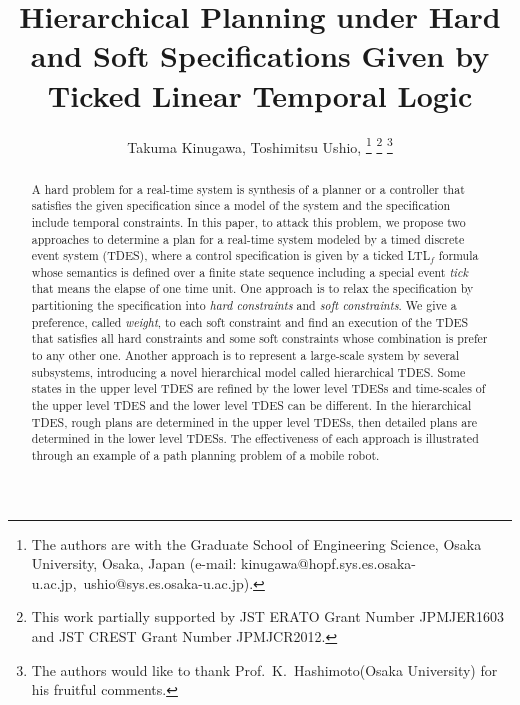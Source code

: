 \documentclass{article}
\begin{document}
%
\title{Hierarchical Planning under Hard and Soft  Specifications Given by Ticked Linear Temporal Logic}
%
\author{Takuma Kinugawa, Toshimitsu Ushio, 
\thanks{The authors are with the Graduate School of Engineering Science, Osaka
University, Osaka, Japan (e-mail: kinugawa@hopf.sys.es.osaka-u.ac.jp,\ ushio@sys.es.osaka-u.ac.jp). }
\thanks{This work partially supported by JST ERATO Grant Number JPMJER1603 and JST CREST Grant Number JPMJCR2012.}
\thanks{The authors would like to thank Prof.\ K.\ Hashimoto(Osaka University) for his fruitful comments.}
}
\maketitle

\begin{abstract}
A hard problem for a real-time system is synthesis of a  planner or a controller that satisfies the given specification since a model of the system and the specification include temporal constraints.
In this paper, to attack this problem, we propose two approaches to determine a plan for a real-time system modeled by a timed discrete event system (TDES), where a control specification is given by a ticked LTL$_f$ formula whose semantics is defined over a finite state sequence including a special event \textit{tick} that means the elapse of one time unit.
One approach is to relax the specification by partitioning the specification into \textit{hard constraints} and \textit{soft constraints}.
We give a preference, called \textit{weight}, to each soft constraint and find an execution of the TDES that satisfies all hard constraints and some soft constraints whose combination is prefer to any other one. 
Another approach is to represent a large-scale system by several subsystems, introducing a novel hierarchical model called hierarchical TDES.
Some states in the upper level TDES are refined by the lower level TDESs and time-scales of the upper level TDES and the lower level TDES can be different.
In the hierarchical TDES, rough plans are determined in the upper level TDESs, then detailed plans are determined in the lower level TDESs.
%
The effectiveness of each approach is illustrated through an example of a path planning problem of a mobile robot.
%
\end{abstract}
\end{document}
